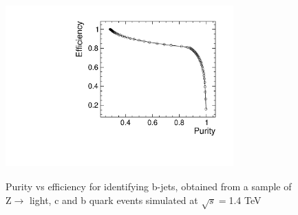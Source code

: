 \begin{figure}[t]
  \centering
  \includegraphics[width=0.78\textwidth,height=7cm,keepaspectratio]{HiggsAnalysis/figures/updatedpurityvsefficiency.pdf}
  \caption[B-Tagging Purity vs Efficiency]{Purity vs efficiency for identifying b-jets, obtained from a sample of Z$\rightarrow$ light, c and b quark events simulated at $\sqrt{s}=$1.4 TeV}
  \label{fig:Zbtagging}
\end{figure}

